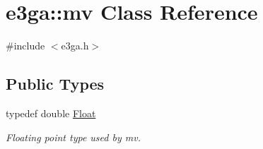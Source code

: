 \hypertarget{classe3ga_1_1mv}{\section{e3ga\-:\-:mv Class Reference}
\label{classe3ga_1_1mv}
}


{\ttfamily \#include $<$e3ga.\-h$>$}

\subsection*{Public Types}
\begin{DoxyCompactItemize}
\item 
\hypertarget{classe3ga_1_1mv_a1df1e531704b110ed3cb240289122370}{typedef double \hyperlink{classe3ga_1_1mv_a1df1e531704b110ed3cb240289122370}{Float}}\label{classe3ga_1_1mv_a1df1e531704b110ed3cb240289122370}

\begin{DoxyCompactList}\small\item\em Floating point type used by mv. \end{DoxyCompactList}\end{DoxyCompactItemize}
